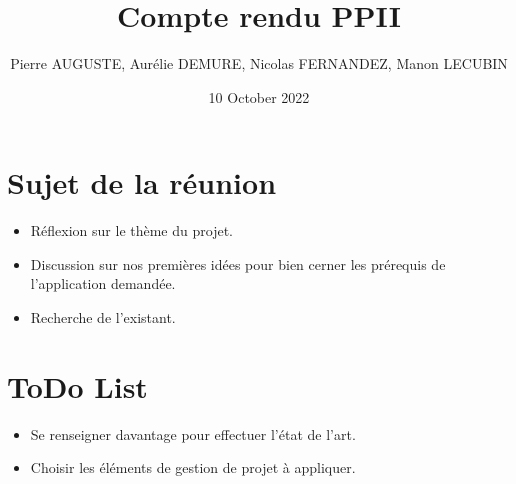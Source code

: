 \documentclass{article}
\title{Compte rendu PPII}
\author{Pierre AUGUSTE, Aurélie DEMURE, Nicolas FERNANDEZ, Manon LECUBIN}
\date{10 October 2022}
\begin{document}
\maketitle

\section{Sujet de la réunion}

\begin{itemize}
    \item Réflexion sur le thème du projet.
    \item Discussion sur nos premières idées pour bien cerner les prérequis de
            l'application demandée.
    \item Recherche de l'existant.
\end{itemize}

\section{ToDo List}
\begin{itemize}
    \item Se renseigner davantage pour effectuer l'état de l'art.
    \item Choisir les éléments de gestion de projet à appliquer.
\end{itemize}
\end{document}
